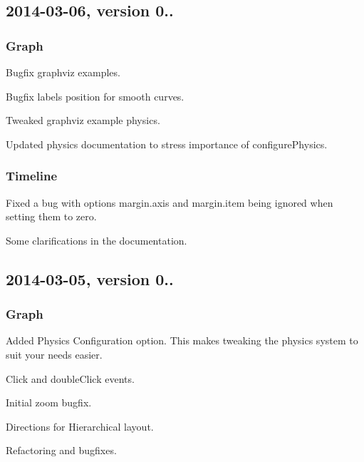 \subsection*{2014-\/03-\/06, version 0..}

\subsubsection*{Graph}


\begin{DoxyItemize}
\item Bugfix graphviz examples.
\item Bugfix labels position for smooth curves.
\item Tweaked graphviz example physics.
\item Updated physics documentation to stress importance of configure\+Physics.
\end{DoxyItemize}

\subsubsection*{Timeline}


\begin{DoxyItemize}
\item Fixed a bug with options {\ttfamily margin.\+axis} and {\ttfamily margin.\+item} being ignored when setting them to zero.
\item Some clarifications in the documentation.
\end{DoxyItemize}

\subsection*{2014-\/03-\/05, version 0..}

\subsubsection*{Graph}


\begin{DoxyItemize}
\item Added Physics Configuration option. This makes tweaking the physics system to suit your needs easier.
\item Click and double\+Click events.
\item Initial zoom bugfix.
\item Directions for Hierarchical layout.
\item Refactoring and bugfixes.
\end{DoxyItemize}

